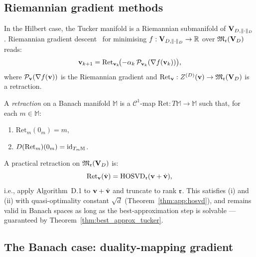 \subsection*{Riemannian gradient methods}

In the Hilbert case, the Tucker manifold is a Riemannian submanifold
of $\mathbf{V}_{D,\|\cdot\|_D}$. Riemannian gradient descent~\cite{UschmajewVandereycken2020}
for minimising $f: \mathbf{V}_{D,\|\cdot\|_D} \to \mathbb{R}$ over $\mathfrak{M}_{\mathfrak{r}}(\mathbf{V}_D)$ reads:
\begin{equation}
\label{eq:app:riem_gradient}
    \mathbf{v}_{k+1}
    = \mathrm{Ret}_{\mathbf{v}_k}\!\bigl(
        -\alpha_k\,\mathcal{P}_{\mathbf{v}_k}(\nabla f(\mathbf{v}_k))
    \bigr),
\end{equation}
where $\mathcal{P}_{\mathbf{v}}(\nabla f(\mathbf{v}))$ is the Riemannian gradient and
$\mathrm{Ret}_{\mathbf{v}}: Z^{(D)}(\mathbf{v}) \to \mathfrak{M}_{\mathfrak{r}}(\mathbf{V}_D)$ is a retraction.

\begin{definition}[Retraction]
\label{def:app:retraction}
A \emph{retraction} on a Banach manifold $\mathbb{M}$ is a
$\mathcal{C}^1$-map $\mathrm{Ret}: T\mathbb{M} \to \mathbb{M}$
such that, for each $m \in \mathbb{M}$:
\begin{enumerate}
\item[\textup{(i)}] $\mathrm{Ret}_m(0_m) = m$,
\item[\textup{(ii)}] $D(\mathrm{Ret}_m)(0_m) = \mathrm{id}_{T_m\mathbb{M}}$.
\end{enumerate}
\end{definition}

\begin{example}
\label{ex:app:tucker_retraction}
A practical retraction on $\mathfrak{M}_{\mathfrak{r}}(\mathbf{V}_D)$ is:
\begin{equation*}
    \mathrm{Ret}_{\mathbf{v}}(\dot{\mathbf{v}})
    = \mathrm{HOSVD}_{\mathfrak{r}}(\mathbf{v} + \dot{\mathbf{v}}),
\end{equation*}
i.e., apply Algorithm~D.1 to $\mathbf{v} + \dot{\mathbf{v}}$ and truncate to rank
$\mathfrak{r}$. This satisfies (i) and (ii) with quasi-optimality constant
$\sqrt{d}$ (Theorem~\ref{thm:app:hosvd}), and remains valid in Banach
spaces as long as the best-approximation step is solvable ---
guaranteed by Theorem~\ref{thm:best_approx_tucker}.
\end{example}

\subsection*{The Banach case: duality-mapping gradient}

